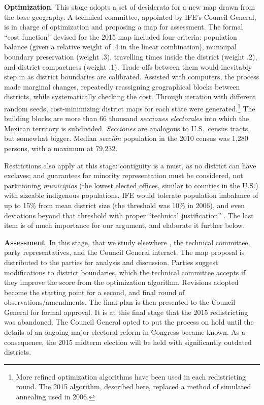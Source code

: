\documentclass[letter,12pt]{article}
\begin{document}
\textbf{Optimization}. This stage adopts a set of desiderata for a new map drawn from the base geography. A technical committee, appointed by IFE's Council General, is in charge of optimization and proposing a map for assessment. The formal ``cost function'' devised for the 2015 map included four criteria: population balance (given a relative weight of .4 in the linear combination), municipal boundary preservation (weight .3), travelling times inside the district (weight .2), and district compactness (weight .1). Trade-offs between them would inevitably step in as district boundaries are calibrated. Assisted with computers, the process made marginal changes, repeatedly reassigning geographical blocks between districts, while systematically checking the cost. Through iteration with different random seeds, cost-minimizing district maps for each state were generated.\footnote{More refined optimization algorithms have been used in each redistricting round. The 2015 algorithm, described here, replaced a method of simulated annealing used in 2006.} The building blocks are more than 66 thousand \emph{secciones electorales} into which the Mexican territory is subdivided. \emph{Secciones} are analogous to U.S.\ census tracts, but somewhat bigger. Median \emph{secci\'on} population in the 2010 census was 1,280 persons, with a maximum at 79,232. 

Restrictions also apply at this stage: contiguity is a must, as no district can have exclaves; and guarantees for minority representation must be considered, not partitioning \emph{municipios} (the lowest elected offices, similar to counties in the U.S.) with sizeable indigenous populations. IFE would tolerate population imbalance of up to 15\% from mean district size (the threshold was 10\% in 2006), and even deviations beyond that threshold with proper ``technical justification'' \citep{ife.acuerdoRedis2013}. The last item is of much importance for our argument, and elaborate it further below.

\textbf{Assessment}. In this stage, that we study elsewhere \citep{altman.magar.mcd.trelles2014apsa}, the technical committee, party representatives, and the Council General interact. The map proposal is distributed to the parties for analysis and discussion. Parties suggest modifications to district boundaries, which the technical committee accepts if they improve the score from the optimization algorithm. Revisions adopted become the starting point for a second, and final round of observations/amendments. The final plan is then presented to the Council General for formal approval. It is at this final stage that the 2015 redistricting was abandoned. The Council General opted to put the process on hold until the details of an ongoing major electoral reform in Congress became known. As a consequence, the 2015 midterm election will be held with significantly outdated districts. 
\end{document}

